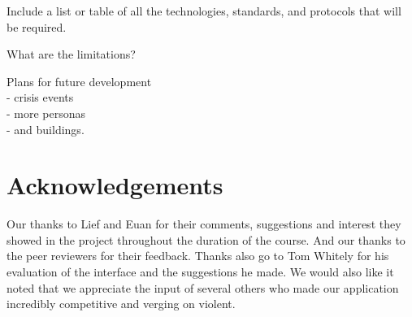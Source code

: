 \documentclass{sig-alt-release2}
\begin{document}
Include a list or table of all the technologies, standards, and protocols that will be required.

What are the limitations?

Plans for future development \\
- crisis events\\
- more personas\\
- and buildings.\\

\section{Acknowledgements}
Our thanks to Lief and Euan for their comments, suggestions and interest they showed in the project throughout the duration of the course. And our thanks to the peer reviewers for their feedback.
Thanks also go to Tom Whitely for his evaluation of the interface and the suggestions he made.
We would also like it noted that we appreciate the input of several others who made our application incredibly competitive and verging on violent.



\end{document}
